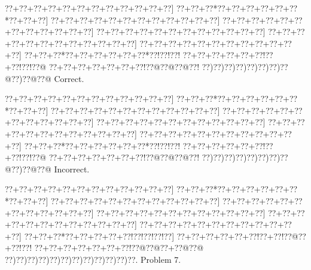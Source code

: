 \documentclass[a5paper]{article}
\begin{document}
\begin{center}
{\goo
\0??+\0??+\0??+\0??+\0??+\0??+\0??+\0??+\0??+\0??+\0??+\0??]
\0??+\0??+\0??*\0??+\0??+\0??+\0??+\0??+\0??*\0??+\0??+\0??]
\0??+\0??+\0??+\0??+\0??+\0??+\0??+\0??+\0??+\0??+\0??+\0??]
\0??+\0??+\0??+\0??+\0??+\0??+\0??+\0??+\0??+\0??+\0??+\0??]
\0??+\0??+\0??+\0??+\0??+\0??+\0??+\0??+\0??+\0??+\0??+\0??]
\0??+\0??+\0??+\0??+\0??+\0??+\0??+\0??+\0??+\0??+\0??+\0??]
\0??+\0??+\0??+\0??+\0??+\0??+\0??+\0??+\0??+\0??+\0??+\0??]
\0??+\0??+\0??*\0??+\0??+\0??+\0??+\0??+\0??*\0??!\0??!\0??!
\0??+\0??+\0??+\0??+\0??+\0??!\0??+\0??!\0??!\0??@
\0??+\0??+\0??+\0??+\0??+\0??+\0??!\0??@\0??@\0??@\0??!
\0??)\0??)\0??)\0??)\0??)\0??)\0??)\0??@\0??)\0??@\0??@
}
Correct. 

\end{center}
\begin{center}
{\goo
\0??+\0??+\0??+\0??+\0??+\0??+\0??+\0??+\0??+\0??+\0??+\0??]
\0??+\0??+\0??*\0??+\0??+\0??+\0??+\0??+\0??*\0??+\0??+\0??]
\0??+\0??+\0??+\0??+\0??+\0??+\0??+\0??+\0??+\0??+\0??+\0??]
\0??+\0??+\0??+\0??+\0??+\0??+\0??+\0??+\0??+\0??+\0??+\0??]
\0??+\0??+\0??+\0??+\0??+\0??+\0??+\0??+\0??+\0??+\0??+\0??]
\0??+\0??+\0??+\0??+\0??+\0??+\0??+\0??+\0??+\0??+\0??+\0??]
\0??+\0??+\0??+\0??+\0??+\0??+\0??+\0??+\0??+\0??+\0??+\0??]
\0??+\0??+\0??*\0??+\0??+\0??+\0??+\0??+\0??*\0??!\0??!\0??!
\0??+\0??+\0??+\0??+\0??+\0??!\0??+\0??!\0??!\0??@
\0??+\0??+\0??+\0??+\0??+\0??+\0??!\0??@\0??@\0??@\0??!
\0??)\0??)\0??)\0??)\0??)\0??)\0??)\0??@\0??)\0??@\0??@
}
Incorrect. 

\end{center}
\newpage
\begin{center}
{\goo
\0??+\0??+\0??+\0??+\0??+\0??+\0??+\0??+\0??+\0??+\0??+\0??]
\0??+\0??+\0??*\0??+\0??+\0??+\0??+\0??+\0??*\0??+\0??+\0??]
\0??+\0??+\0??+\0??+\0??+\0??+\0??+\0??+\0??+\0??+\0??+\0??]
\0??+\0??+\0??+\0??+\0??+\0??+\0??+\0??+\0??+\0??+\0??+\0??]
\0??+\0??+\0??+\0??+\0??+\0??+\0??+\0??+\0??+\0??+\0??+\0??]
\0??+\0??+\0??+\0??+\0??+\0??+\0??+\0??+\0??+\0??+\0??+\0??]
\0??+\0??+\0??+\0??+\0??+\0??+\0??+\0??+\0??+\0??+\0??+\0??]
\0??+\0??+\0??*\0??+\0??+\0??+\0??+\0??!\0??!\0??!\0??!\0??]
\0??+\0??+\0??+\0??+\0??+\0??!\0??+\0??!\0??@\0??+\0??!\0??!
\0??+\0??+\0??+\0??+\0??+\0??+\0??!\0??@\0??@\0??+\0??@\0??@
\0??)\0??)\0??)\0??)\0??)\0??)\0??)\0??)\0??)\0??)\0??)\0??.
}
Problem 7.

\end{center}
\end{document}
